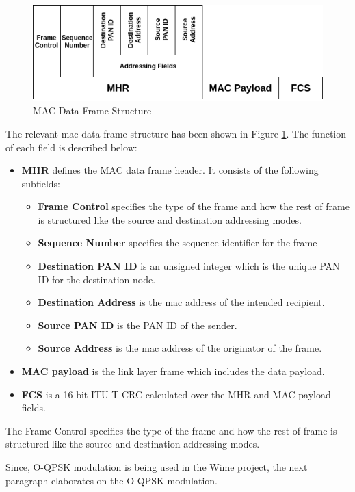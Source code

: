 \begin{figure}[h!]
\centering
\includegraphics[scale=0.6]{Figure/DataFrame.png}
\caption{MAC Data Frame Structure}
\label{data_frame}
\end{figure}

The relevant \ac{mac} data frame structure has been shown in Figure \ref{data_frame}.
The function of each field is described below:
\begin{itemize}
\item{\textbf{MHR} defines the MAC data frame header. It consists of the following subfields:
\begin{itemize}
\item{\textbf{Frame Control} specifies the type of the frame and how the rest of frame is structured like the source and destination addressing modes.}
\item{\textbf{Sequence Number} specifies the sequence identifier for the frame}
\item{\textbf{Destination PAN ID} is an unsigned integer which is the unique \ac{PAN} ID for the destination node.}
\item{\textbf{Destination Address} is the \ac{mac} address of the intended recipient.}
\item{\textbf{Source PAN ID} is the \ac{PAN} ID of the sender.}
\item{ \textbf{Source Address} is the \ac{mac} address of the originator of the frame.} 
\end{itemize}}
\item{\textbf{MAC payload} is the link layer frame which includes the data payload. }
\item{\textbf{\ac{FCS}} is a 16-bit ITU-T \ac{CRC} calculated over the MHR and MAC payload fields.} 
\end{itemize}
The Frame Control specifies the type of the frame and how the rest of frame is structured like the source and destination addressing modes.

Since, \ac{O-QPSK} modulation is being used in the Wime project, the next paragraph elaborates on the \ac{O-QPSK} modulation.

